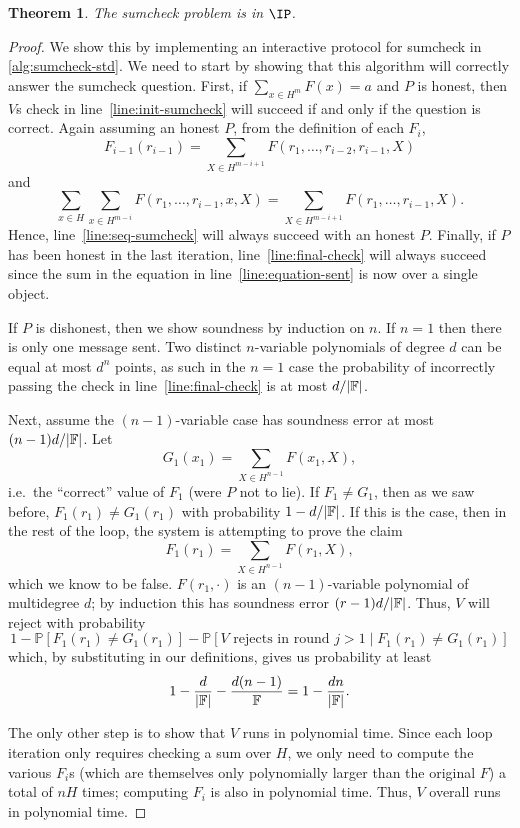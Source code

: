\documentclass[english,12pt]{reedthesis}
\theoremstyle{plain}
\newtheorem{thm}{Theorem}[section]
\theoremstyle{definition}
\theoremstyle{remark}
\DeclarePairedDelimiter{\abs}{\lvert}{\rvert}
\begin{document}
\begin{thm}\label{thm:sumcheck-ip}
  The sumcheck problem is in $\IP$.
\end{thm}

\begin{proof}
  We show this by implementing an interactive protocol for sumcheck in
  \cref{alg:sumcheck-std}. We need to start by showing that this algorithm will
  correctly answer the sumcheck question. First, if $\sum_{x \in H^{m}}F(x) = a$ and
  $P$ is honest, then $V$s check in line~\ref{line:init-sumcheck} will succeed
  if and only if the question is correct. Again assuming an honest $P$, from the
  definition of each $F_{i}$,
  \[
    F_{i-1}(r_{i-1}) = \sum_{X \in H^{m-i+1}}F(r_{1}, \ldots, r_{i-2}, r_{i-1}, X)
  \]
  and
  \[
    \sum_{x \in H}\sum_{x \in H^{m-i}}F(r_{1}, \ldots, r_{i-1}, x, X) = \sum_{X \in H^{m-i+1}}F(r_{1}, \ldots, r_{i-1}, X).
  \]
  Hence, line~\ref{line:seq-sumcheck} will always succeed with an honest $P$.
  Finally, if $P$ has been honest in the last iteration,
  line~\ref{line:final-check} will always succeed since the sum in the equation
  in line~\ref{line:equation-sent} is now over a single object.

  If $P$ is dishonest, then we show soundness by induction on $n$. If $n = 1$
  then there is only one message sent. Two distinct $n$-variable polynomials of
  degree $d$ can be equal at most $d^{n}$ points, as such in the $n = 1$ case
  the probability of incorrectly passing the check in
  line~\ref{line:final-check} is at most $d/\abs{\mathbb{F}}$.

  Next, assume the $(n - 1)$-variable case has soundness error at most
  $(n - 1)d/\abs{\mathbb{F}}$. Let
  \[
    G_{1}(x_{1}) = \sum_{X \in H^{n-1}}F(x_{1}, X),
  \]
  i.e.\ the ``correct'' value of $F_{1}$ (were $P$ not to lie). If
  $F_{1} \ne G_{1}$, then as we saw before, $F_{1}(r_{1}) \ne G_{1}(r_{1})$ with
  probability $1 - d/\abs{\mathbb{F}}$. If this is the case, then in the rest of
  the loop, the system is attempting to prove the claim
  \[
    F_{1}(r_{1}) = \sum_{X \in H^{n-1}}F(r_{1}, X),
  \]
  which we know to be false. $F(r_{1}, \cdot)$ is an $(n - 1)$-variable polynomial
  of multidegree $d$; by induction this has soundness error
  $(r - 1)d/\abs{\mathbb{F}}$. Thus, $V$ will reject with probability
  \[
    1 - \mathbb{P}[F_{1}(r_{1}) \ne G_{1}(r_{1})] - \mathbb{P}[V \text{ rejects in round } j > 1 \mid F_{1}(r_{1}) \ne G_{1}(r_{1})]
  \]
  which, by substituting in our definitions, gives us probability at least
  \[
    1 - \frac{d}{\abs{\mathbb{F}}} - \frac{d(n - 1)}{\mathbb{F}} = 1 - \frac{dn}{\abs{\mathbb{F}}}.
  \]

  The only other step is to show that $V$ runs in polynomial time. Since each
  loop iteration only requires checking a sum over $H$, we only need to compute
  the various $F_{i}$s (which are themselves only polynomially larger than the
  original $F$) a total of $nH$ times; computing $F_{i}$ is also in polynomial
  time. Thus, $V$ overall runs in polynomial time.
\end{proof}
\end{document}
